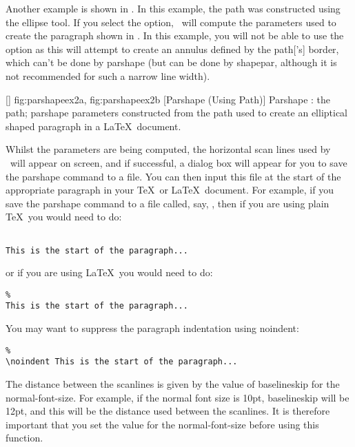 Another example is shown in . In this
example, the \gls*{path} was constructed using the ellipse tool. If you
select the  option, \FlowframTk\ will compute the
parameters used to create the paragraph shown in
. In this example, you will not be
able to use the  option as this will attempt to
create an annulus defined by the \gls*{path}['s] border, which can't be
done by \gls{parshape} (but can be done by \gls{shapepar},
although it is not recommended for such a narrow line width).

[\small]
{
 {fig:parshapeex2a}{}{},
 {fig:parshapeex2b}{}{}
}
[Parshape (Using Path)]
{Parshape :
 the path;
 \gls{parshape} parameters constructed from the 
path 
used to create an elliptical shaped paragraph in a \LaTeX\ document.}

Whilst the parameters are being computed, the horizontal
scan lines used by \FlowframTk\ will appear on screen, and if
successful, a dialog box will appear for you to save the
\gls{parshape} command to a file. You can then input this
file at the start of the appropriate paragraph in your \TeX\ or
\LaTeX\ document. For example, if you save the \gls{parshape}
command to a file called, say, , then if
you are using plain \TeX\ you would need to do:
\begin{verbatim}

This is the start of the paragraph...
\end{verbatim}
or if you are using \LaTeX\ you would need to do:
\begin{verbatim}
%
This is the start of the paragraph...
\end{verbatim}
You may want to suppress the paragraph indentation using
\gls{noindent}:
\begin{verbatim}
%
\noindent This is the start of the paragraph...
\end{verbatim}

The distance between the scanlines is given by the
value of \gls{baselineskip} for the \gls{normal-font-size}.
For example, if the normal font size is 10\gls{pt}, \gls{baselineskip}
will be 12pt, and this will be the distance used between
the scanlines. It is therefore important that you set the value
for the \gls{normal-font-size} before using this function.

